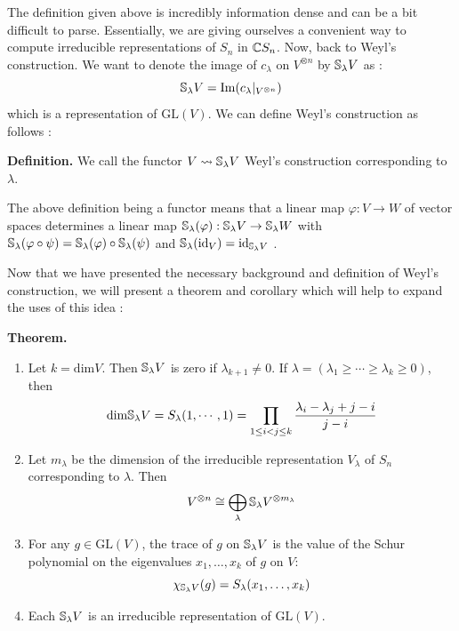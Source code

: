 \documentclass[11pt, a4paper, oneside]{article}
\theoremstyle{plain}
\theoremstyle{definition}
\theoremstyle{example}
\def\GL{\mathrm{GL}} \def\SL{\mathrm{SL}} \def\sl{\mathrm{sl}} \def\gl{\mathrm{gl}} \def\SO{\mathrm{SO}} \def\SU{\mathrm{SU}}  \def\SP{\mathrm{SP}} \def\g{\mathfrak{g}} \def\h{\mathfrak{h}} \def\Sym{\mathrm{Sym}}
\def\dim{\mathrm{dim}}
\def\id{\mathrm{id}}
\def\image{\mathrm{Im}}
\begin{document}
The definition given above is incredibly information dense and can be a bit difficult to parse. Essentially, we are giving ourselves a convenient way to compute irreducible representations of $S_n$ in $\mathbb{C} S_n$. Now, back to Weyl's construction. We want to denote the image of $c_{\lambda}$ on $V^{\otimes n}$ by $\mathbb{S}_{\lambda} V$ as \cite[\S 6.1]{fulton}: $$\SS_{\lambda} V = \image(c_{\lambda} |_{V^{\otimes n}})$$ which is a representation of $\GL(V)$. We can define Weyl's construction as follows \cite[\S 6.1]{fulton}:

\par
\textbf{Definition.} We call the functor $V \rightsquigarrow \mathbb{S}_{\lambda} V$ Weyl's construction corresponding to $\lambda$.

\par
The above definition being a functor means that a linear map $\varphi: V \to W$ of vector spaces determines a linear map $\mathbb{S}_{\lambda}(\varphi): \mathbb{S}_{\lambda} V \to \mathbb{S}_{\lambda} W$ with $\mathbb{S}_{\lambda}(\varphi \circ \psi) = \mathbb{S}_{\lambda}(\varphi) \circ \mathbb{S}_{\lambda}(\psi)$ and $\SS_{\lambda}(\id_V) = \id_{\SS_{\lambda} V}$ \cite[\S 6.1]{fulton}.

\par
Now that we have presented the necessary background and definition of Weyl's construction, we will present a theorem and corollary which will help to expand the uses of this idea \cite[\S 6.1, Theorem 6.3]{fulton}:

\par
\textbf{Theorem.} \begin{enumerate}
\item Let $k = \dim V$. Then $\mathbb{S}_{\lambda} V$ is zero if $\lambda_{k+1} \neq 0$. If $\lambda = (\lambda_1 \geq \cdots \geq \lambda_k \geq 0)$, then $$\dim \SS_{\lambda} V = S_{\lambda}(1, \cdots, 1) = \prod_{1 \leq i< j \leq k} \frac{\lambda_i - \lambda_j + j - i}{j-i}$$
\item Let $m_{\lambda}$ be the dimension of the irreducible representation $V_{\lambda}$ of $S_n$ corresponding to $\lambda$. Then $$V^{\otimes n} \cong \bigoplus_{\lambda} \mathbb{S}_{\lambda} V^{\otimes m_{\lambda}}$$
\item For any $g \in \GL(V)$, the trace of $g$ on $\mathbb{S}_{\lambda} V$ is the value of the Schur polynomial on the eigenvalues $x_1, \ldots, x_k$ of $g$ on $V$: $$\chi_{\mathbb{S}_{\lambda}V}(g) = S_{\lambda}(x_1, \ldots, x_k)$$
\item Each $\mathbb{S}_{\lambda} V$ is an irreducible representation of $\GL(V)$.
\end{enumerate}
\end{document}
